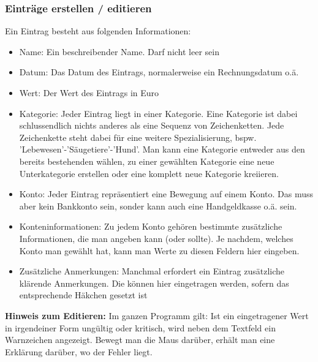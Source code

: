 \documentclass[a4paper,10pt,halfparskip,oneside,smallheadings]{scrbook}
\begin{document}
\subsubsection{Einträge erstellen / editieren}
Ein Eintrag besteht aus folgenden Informationen:
\begin{itemize}
 \item Name: Ein beschreibender Name. Darf nicht leer sein
 \item Datum: Das Datum des Eintrags, normalerweise ein Rechnungsdatum o.ä.
 \item Wert: Der Wert des Eintrags in Euro
 \item Kategorie: Jeder Eintrag liegt in einer Kategorie. Eine Kategorie ist dabei schlussendlich nichts anderes als eine Sequenz von Zeichenketten. Jede Zeichenkette steht dabei für eine weitere Spezialisierung, bspw. 'Lebewesen'-'Säugetiere'-'Hund'. Man kann eine Kategorie entweder aus den bereits bestehenden wählen, zu einer gewählten Kategorie eine neue Unterkategorie erstellen oder eine komplett neue Kategorie kreiieren.
 \item Konto: Jeder Eintrag repräsentiert eine Bewegung auf einem Konto. Das muss aber kein Bankkonto sein, sonder kann auch eine Handgeldkasse o.ä. sein.
 \item Konteninformationen: Zu jedem Konto gehören bestimmte zusätzliche Informationen, die man angeben kann (oder sollte). Je nachdem, welches Konto man gewählt hat, kann man Werte zu diesen Feldern hier eingeben.
 \item Zusätzliche Anmerkungen: Manchmal erfordert ein Eintrag zusätzliche klärende Anmerkungen. Die können hier eingetragen werden, sofern das entsprechende Häkchen gesetzt ist
\end{itemize}
\textbf{Hinweis zum Editieren:} Im ganzen Programm gilt: Ist ein eingetragener Wert in irgendeiner Form ungültig oder kritisch, wird neben dem Textfeld ein Warnzeichen angezeigt. Bewegt man die Maus darüber, erhält man eine Erklärung darüber, wo der Fehler liegt.
\end{document}
